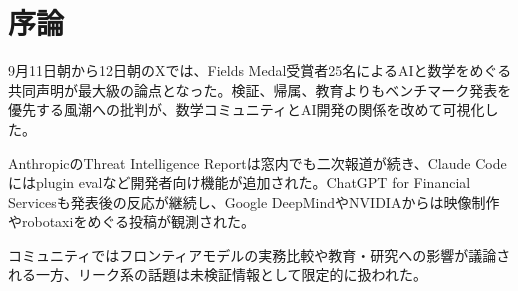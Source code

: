 \section{序論}
9月11日朝から12日朝のXでは、Fields Medal受賞者25名によるAIと数学をめぐる共同声明が最大級の論点となった。検証、帰属、教育よりもベンチマーク発表を優先する風潮への批判が、数学コミュニティとAI開発の関係を改めて可視化した。

AnthropicのThreat Intelligence Reportは窓内でも二次報道が続き、Claude Codeにはplugin evalなど開発者向け機能が追加された。ChatGPT for Financial Servicesも発表後の反応が継続し、Google DeepMindやNVIDIAからは映像制作やrobotaxiをめぐる投稿が観測された。

コミュニティではフロンティアモデルの実務比較や教育・研究への影響が議論される一方、リーク系の話題は未検証情報として限定的に扱われた。
